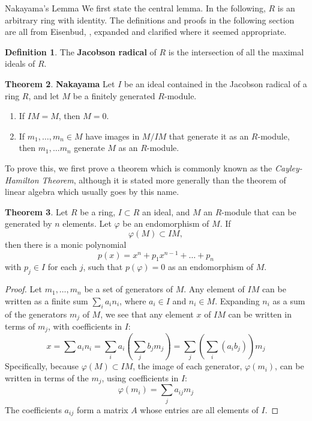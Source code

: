 \documentclass[12pt]{article}
\theoremstyle{definition}
\newtheorem{definition}{Definition}[section]
\newtheorem{theorem}[definition]{Theorem}
\begin{document}
\begin{section}{Nakayama's Lemma}
	We first state the central lemma. In the following, $R$ is an arbitrary ring with identity. The definitions and proofs in the following section are all from Eisenbud, \cite{eisenbud}, expanded and clarified where it seemed appropriate.
	\begin{definition}
		The \textbf{Jacobson radical} of $R$ is the intersection of all the maximal ideals of $R$.
\label{jac}
	\end{definition}
	\begin{theorem}\textbf{Nakayama}
		Let $I$ be an ideal contained in the Jacobson radical of a ring $R$, and let $M$ be a finitely generated $R$-module.
		\begin{enumerate}[label=\alph*.]
			\item If $IM = M$, then $M = 0$.
			\item If $m_1, \dots , m_n \in M$ have images in $M/IM$ that generate it as an $R$-module, then $m_1, \dots m_n$ generate $M$ as an $R$-module.
		\end{enumerate}
		\label{nak}
	\end{theorem}
	To prove this, we first prove a theorem which is commonly known as the \textit{Cayley-Hamilton Theorem}, although it is stated more generally than the theorem of linear algebra which usually goes by this name. 
	\begin{theorem}
		Let $R$ be a ring, $I\subset R$ an ideal, and $M$ an $R$-module that can be generated by $n$ elements. Let $\varphi$ be an endomorphism of $M$. If 
		\[\varphi(M)\subset IM,\]
		then there is a monic polynomial 
		\[p(x) = x^n + p_1x^{n-1} + \dots + p_n\]
		with $p_j \in I$ for each $j$, such that $p(\varphi) = 0$ as an endomorphism of $M$.
		\begin{proof}
			Let $m_1, \dots, m_n$ be a set of generators of $M$. Any element of $IM$ can be written as a finite sum $\sum_i a_i n_i$, where $a_i \in I$ and $n_i \in M$. Expanding $n_i$ as a sum of the generators $m_j$ of $M$, we see that any element $x$ of $IM$ can be written in terms of $m_j$, with coefficients in $I$:
			\[x = \sum a_i n_i = \sum_i a_i (\sum_j b_j m_j) = \sum_{j}\left(\sum_i (a_ib_j)\right) m_j\]
			Specifically, because $\varphi(M)\subset IM$, the image of each generator, $\varphi(m_i)$, can be written in terms of the $m_j$, using coefficients in $I$:
			\begin{equation}\varphi(m_i) = \sum_j a_{ij}m_j\label{matrix}\end{equation}
			The coefficients $a_{ij}$ form a matrix $A$ whose entries are all elements of $I$.

\end{proof}
\end{theorem}
\end{section}
\end{document}
